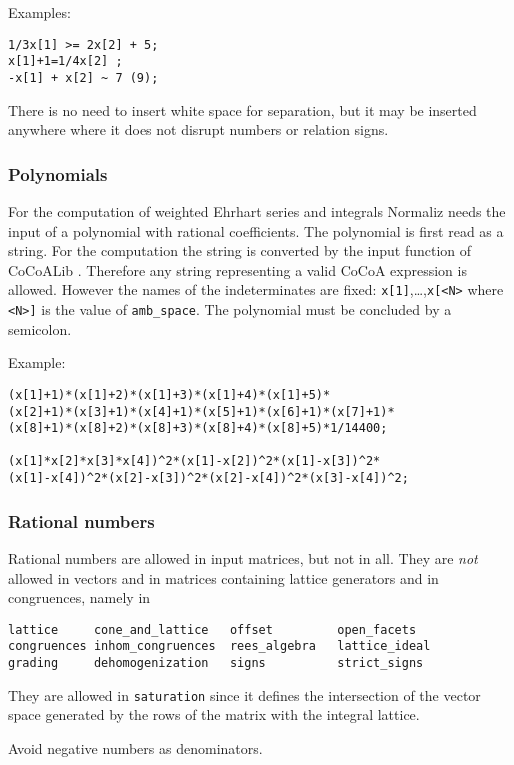 \documentclass[12pt,a4paper]{scrartcl}
\theoremstyle{definition}
\begin{document}
Examples:
\begin{Verbatim}
1/3x[1] >= 2x[2] + 5;
x[1]+1=1/4x[2] ;
-x[1] + x[2] ~ 7 (9);
\end{Verbatim}

There is no need to insert white space for separation, but it may be inserted anywhere where it does not disrupt numbers or relation signs.

\subsubsection{Polynomials}\label{poly_input}

For the computation of weighted Ehrhart series and integrals Normaliz needs the input of a polynomial with rational coefficients. The polynomial is first read as a string. For the computation the string is converted by the input function of CoCoALib \cite{CoCoA}. Therefore any string representing a valid CoCoA expression is allowed. However the names of the indeterminates are fixed: \verb|x[1]|,\dots,\verb|x[<N>| where \verb|<N>]| is the value of \verb|amb_space|. The polynomial must be concluded by a semicolon.

Example:
\begin{Verbatim}
(x[1]+1)*(x[1]+2)*(x[1]+3)*(x[1]+4)*(x[1]+5)*
(x[2]+1)*(x[3]+1)*(x[4]+1)*(x[5]+1)*(x[6]+1)*(x[7]+1)*
(x[8]+1)*(x[8]+2)*(x[8]+3)*(x[8]+4)*(x[8]+5)*1/14400;

(x[1]*x[2]*x[3]*x[4])^2*(x[1]-x[2])^2*(x[1]-x[3])^2*
(x[1]-x[4])^2*(x[2]-x[3])^2*(x[2]-x[4])^2*(x[3]-x[4])^2;
\end{Verbatim}

\subsubsection{Rational numbers}\label{rational_input}

Rational numbers are allowed in input matrices, but not in all. They are \emph{not} allowed in vectors and in matrices containing lattice generators and in congruences, namely in
\begin{Verbatim}
lattice     cone_and_lattice   offset         open_facets
congruences inhom_congruences  rees_algebra   lattice_ideal
grading     dehomogenization   signs          strict_signs
\end{Verbatim}
They are allowed in \verb|saturation| since it defines the intersection of the vector space generated by the rows of the matrix with the integral lattice.

Avoid negative numbers as denominators.
\end{document}
